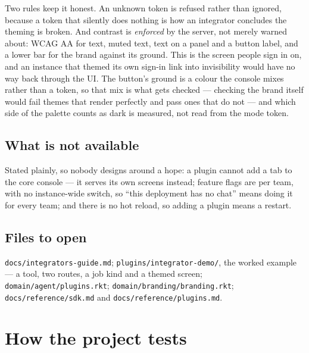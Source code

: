\documentclass[11pt,a4paper]{report}
\gdef\currentchapterart{art/telemachus-head.png}
\newcommand{\chapterart}[1]{\gdef\currentchapterart{#1}}
\newcommand{\chapterart}[1]{}
\begin{document}
Two rules keep it honest. An unknown token is refused rather than ignored, because a token that silently does nothing is how an integrator concludes the theming is broken. And contrast is \emph{enforced} by the server, not merely warned about: WCAG AA for text, muted text, text on a panel and a button label, and a lower bar for the brand against its ground. This is the screen people sign in on, and an instance that themed its own sign-in link into invisibility would have no way back through the UI. The button's ground is a colour the console mixes rather than a token, so that mix is what gets checked --- checking the brand itself would fail themes that render perfectly and pass ones that do not --- and which side of the palette counts as dark is measured, not read from the mode token.

\section{What is not available}

Stated plainly, so nobody designs around a hope: a plugin cannot add a tab to the core console --- it serves its own screens instead; feature flags are per team, with no instance-wide switch, so ``this deployment has no chat'' means doing it for every team; and there is no hot reload, so adding a plugin means a restart.

\section{Files to open}

\texttt{docs/integrators-guide.md}; \texttt{plugins/integrator-demo/}, the worked example --- a tool, two routes, a job kind and a themed screen; \texttt{domain/agent/plugins.rkt}; \texttt{domain/branding/branding.rkt}; \texttt{docs/reference/sdk.md} and \texttt{docs/reference/plugins.md}.

\chapterart{art/ch-16-tests.png}
\chapter{How the project tests}
\end{document}
